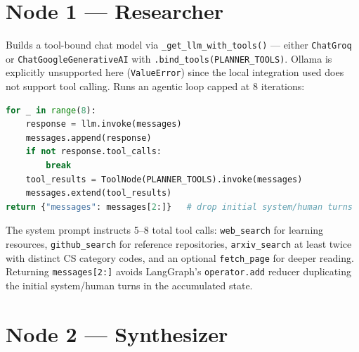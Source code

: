 \documentclass[11pt,a4paper]{report}
\newcommand{\code}[1]{\texttt{\small #1}}
\begin{document}
\begin{center}
\end{center}

\section{Node 1 — Researcher}

Builds a tool-bound chat model via \code{\_get\_llm\_with\_tools()} — either \code{ChatGroq} or \code{ChatGoogleGenerativeAI} with \code{.bind\_tools(PLANNER\_TOOLS)}. Ollama is explicitly unsupported here (\code{ValueError}) since the local integration used does not support tool calling. Runs an agentic loop capped at 8 iterations:

\begin{lstlisting}[language=Python,caption={Agentic tool-calling loop (simplified)}]
for _ in range(8):
    response = llm.invoke(messages)
    messages.append(response)
    if not response.tool_calls:
        break
    tool_results = ToolNode(PLANNER_TOOLS).invoke(messages)
    messages.extend(tool_results)
return {"messages": messages[2:]}   # drop initial system/human turns
\end{lstlisting}

The system prompt instructs 5–8 total tool calls: \code{web\_search} for learning resources, \code{github\_search} for reference repositories, \code{arxiv\_search} at least twice with distinct CS category codes, and an optional \code{fetch\_page} for deeper reading. Returning \code{messages[2:]} avoids LangGraph's \code{operator.add} reducer duplicating the initial system/human turns in the accumulated state.

\section{Node 2 — Synthesizer}
\end{document}
